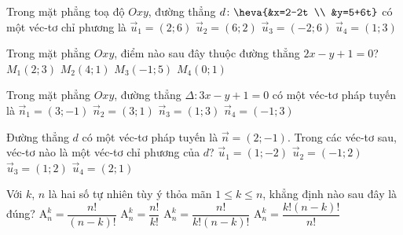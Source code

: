 \begin{ex}%
	Trong mặt phẳng toạ độ $Oxy$, đường thẳng $d \colon \heva{&x=2-2t \\ &y=5+6t}$ có một véc-tơ chỉ phương là
	\choice
	{$\overrightarrow{u}_1=(2;6)$}
	{$\overrightarrow{u}_2=(6;2)$}
	{\True $\overrightarrow{u}_3=(-2;6)$}
	{$\overrightarrow{u}_4=(1;3)$}
\end{ex}
\begin{ex}%
	Trong mặt phẳng $Oxy$, điểm nào sau đây thuộc đường thẳng $2x-y+1=0$?	
	\choice
	{$M_1 (2;3)$}
	{$M_2 (4;1)$}
	{$M_3 (-1;5)$}
	{\True $M_4 (0;1)$}
\end{ex}
\begin{ex}%
	Trong mặt phẳng $Oxy$, đường thẳng $\Delta \colon 3x-y+1=0$ có một véc-tơ pháp tuyến là	
	\choice
	{\True$\overrightarrow{n}_1=(3;-1)$}
	{$\overrightarrow{n}_2=(3;1)$}
	{ $\overrightarrow{n}_3=(1;3)$}
	{$\overrightarrow{n}_4=(-1;3)$}
\end{ex}
\begin{ex}%
	Đường thẳng $d$ có một véc-tơ pháp tuyến là $\overrightarrow{n}=(2;-1)$. Trong các véc-tơ sau, véc-tơ nào là một véc-tơ chỉ phương của $d$?	
	\choice
	{$\overrightarrow{u}_1=(1;-2)$}
	{$\overrightarrow{u}_2=(-1;2)$}
	{\True $\overrightarrow{u}_3=(1;2)$}
	{$\overrightarrow{u}_4=(2;1)$}
\end{ex}
\begin{ex}%
	Với $k$, $n$ là hai số tự nhiên tùy ý thỏa mãn $1 \le k \le n$, khẳng định nào sau đây là đúng?	
	\choice
	{\True $\mathrm{A}_n^k=\dfrac{n!}{\left(n-k\right)!}$}
	{$\mathrm{A}_n^k=\dfrac{n!}{k!}$}
	{$\mathrm{A}_n^k=\dfrac{n!}{k!\left(n-k\right)!}$}	{$\mathrm{A}_n^k=\dfrac{k!\left(n-k\right)!}{n!}$}
\end{ex}
